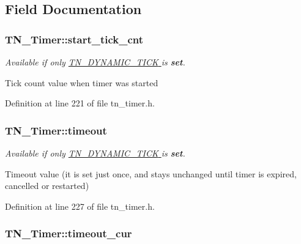 \subsection{Field Documentation}
\hypertarget{structTN__Timer_ab1410fa78c9099a6bc4dd3f43f1f52e4}{
\subsubsection[{start\+\_\+tick\+\_\+cnt}]{ T\+N\+\_\+\+Timer\+::start\+\_\+tick\+\_\+cnt}}\label{structTN__Timer_ab1410fa78c9099a6bc4dd3f43f1f52e4}


{\itshape Available if only \hyperlink{tn__cfg__default_8h_aaee875834a86f961318c584095c366fe}{{\ttfamily T\+N\+\_\+\+D\+Y\+N\+A\+M\+I\+C\+\_\+\+T\+I\+C\+K} } is {\bfseries set}.} 

Tick count value when timer was started 

Definition at line 221 of file tn\+\_\+timer.\+h.

\hypertarget{structTN__Timer_a893c5b01ec38bdcbcf2294cc950ffd09}{
\subsubsection[{timeout}]{ T\+N\+\_\+\+Timer\+::timeout}}\label{structTN__Timer_a893c5b01ec38bdcbcf2294cc950ffd09}


{\itshape Available if only \hyperlink{tn__cfg__default_8h_aaee875834a86f961318c584095c366fe}{{\ttfamily T\+N\+\_\+\+D\+Y\+N\+A\+M\+I\+C\+\_\+\+T\+I\+C\+K} } is {\bfseries set}.} 

Timeout value (it is set just once, and stays unchanged until timer is expired, cancelled or restarted) 

Definition at line 227 of file tn\+\_\+timer.\+h.

\hypertarget{structTN__Timer_a6041c660dad74778f668bac9ae844465}{
\subsubsection[{timeout\+\_\+cur}]{ T\+N\+\_\+\+Timer\+::timeout\+\_\+cur}}\label{structTN__Timer_a6041c660dad74778f668bac9ae844465}


